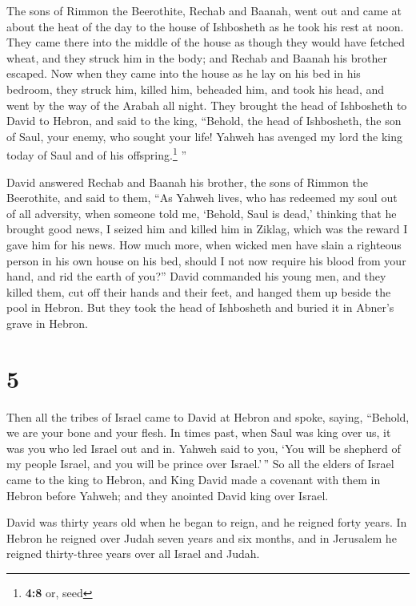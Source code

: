  The sons of Rimmon the Beerothite, Rechab and Baanah,
went out and came at about the heat of the day to the house of
Ishbosheth as he took his rest at noon.  They came there
into the middle of the house as though they would have fetched wheat,
and they struck him in the body; and Rechab and Baanah his brother
escaped.  Now when they came into the house as he lay on
his bed in his bedroom, they struck him, killed him, beheaded him, and
took his head, and went by the way of the Arabah all night.
 They brought the head of Ishbosheth to David to Hebron,
and said to the king, ``Behold, the head of Ishbosheth, the son of Saul,
your enemy, who sought your life! Yahweh has avenged my lord the king
today of Saul and of his offspring.\footnote{\textbf{4:8} or, seed} ''

 David answered Rechab and Baanah his brother, the sons of
Rimmon the Beerothite, and said to them, ``As Yahweh lives, who has
redeemed my soul out of all adversity,  when someone told
me, `Behold, Saul is dead,' thinking that he brought good news, I seized
him and killed him in Ziklag, which was the reward I gave him for his
news.  How much more, when wicked men have slain a
righteous person in his own house on his bed, should I not now require
his blood from your hand, and rid the earth of you?'' 
David commanded his young men, and they killed them, cut off their hands
and their feet, and hanged them up beside the pool in Hebron. But they
took the head of Ishbosheth and buried it in Abner's grave in Hebron.

\hypertarget{section-4}{%
\section{5}\label{section-4}}

 Then all the tribes of Israel came to David at Hebron and
spoke, saying, ``Behold, we are your bone and your flesh. 
In times past, when Saul was king over us, it was you who led Israel out
and in. Yahweh said to you, `You will be shepherd of my people Israel,
and you will be prince over Israel.'\,''  So all the
elders of Israel came to the king to Hebron, and King David made a
covenant with them in Hebron before Yahweh; and they anointed David king
over Israel.

 David was thirty years old when he began to reign, and he
reigned forty years.  In Hebron he reigned over Judah
seven years and six months, and in Jerusalem he reigned thirty-three
years over all Israel and Judah.

